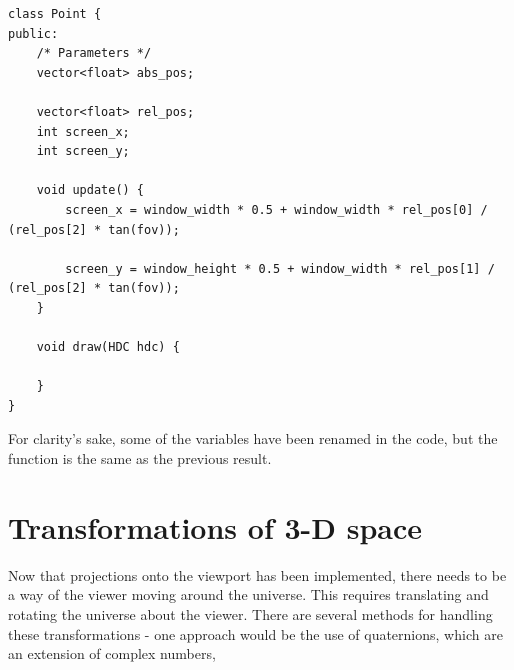 \documentclass{article}
\begin{document}
\begin{lstlisting}
class Point {
public:
	/* Parameters */
	vector<float> abs_pos;
	
	vector<float> rel_pos;
	int screen_x;
	int screen_y;	
	
	void update() {
		screen_x = window_width * 0.5 + window_width * rel_pos[0] / (rel_pos[2] * tan(fov));

		screen_y = window_height * 0.5 + window_width * rel_pos[1] / (rel_pos[2] * tan(fov));
	}
	
	void draw(HDC hdc) {
	
	}
}

\end{lstlisting}
For clarity's sake, some of the variables have been renamed in the code, but the function is the same as the previous result.

\newpage

\section{Transformations of 3-D space}
Now that projections onto the viewport has been implemented, there needs to be a way of the viewer moving around the universe. This requires translating and rotating the universe about the viewer.
\newline
\newline
There are several methods for handling these transformations - one approach would be the use of quaternions, which are an extension of complex numbers, 
\end{document}

